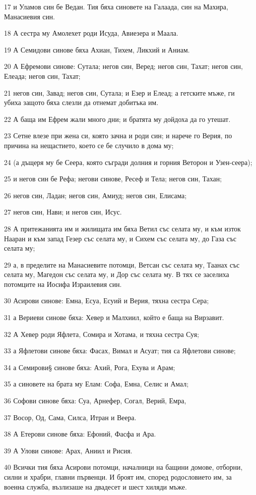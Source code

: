 \par 17 и Уламов син бе Ведан. Тия бяха синовете на Галаада, син на Махира, Манасиевия син.
\par 18 А сестра му Амолехет роди Исуда, Авиезера и Маала.
\par 19 А Семидови синове бяха Ахиан, Тихем, Ликхий и Аниам.
\par 20 А Ефремови синове: Сутала; негов син, Веред; негов син, Тахат; негов син, Елеада; негов син, Тахат;
\par 21 негов син, Завад; негов син, Сутала; и Езер и Елеад; а гетските мъже, ги убиха защото бяха слезли да отнемат добитъка им.
\par 22 А баща им Ефрем жали много дни; и братята му дойдоха да го утешат.
\par 23 Сетне влезе при жена си, която зачна и роди син; и нарече го Верия, по причина на нещастието, което се бе случило в дома му;
\par 24 (а дъщеря му бе Сеера, която съгради долния и горния Веторон и Узен-сеера);
\par 25 и негов син бе Рефа; негови синове, Ресеф и Тела; негов син, Тахан;
\par 26 негов син, Ладан; негов син, Амиуд; негов син, Елисама;
\par 27 негов син, Нави; и негов син, Исус.
\par 28 А притежанията им и жилищата им бяха Ветил със селата му, и към изток Нааран и към запад Гезер със селата му, и Сихем със селата му, до Газа със селата му;
\par 29 а, в пределите на Манасиевите потомци, Ветсан със селата му, Таанах със селата му, Магедон със селата му, и Дор със селата му. В тях се заселиха потомците на Иосифа Израилевия син.
\par 30 Асирови синове: Емна, Есуа, Есуий и Верия, тяхна сестра Сера;
\par 31 а Вериеви синове бяха: Хевер и Малхиил, който е баща на Вирзавит.
\par 32 А Хевер роди Яфлета, Сомира и Хотама, и тяхна сестра Суя;
\par 33 а Яфлетови синове бяха: Фасах, Вимал и Асуат; тия са Яфлетови синове;
\par 34 а Семирови§ синове бяха: Ахий, Рога, Ехува и Арам;
\par 35 а синовете на брата му Елам: Софа, Емна, Селис и Амал;
\par 36 Софови синове бяха: Суа, Арнефер, Согал, Верий, Емра,
\par 37 Восор, Од, Сама, Силса, Итран и Веера.
\par 38 А Етерови синове бяха: Ефоний, Фасфа и Ара.
\par 39 А Улови синове: Арах, Аниил и Рисия.
\par 40 Всички тия бяха Асирови потомци, началници на бащини домове, отборни, силни и храбри, главни първенци. И броят им, според родословието им, за военна служба, възлизаше на двадесет и шест хиляди мъже.

